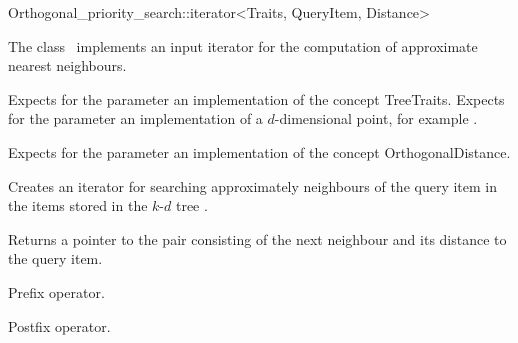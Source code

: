 

\begin{ccRefClass}{Orthogonal_priority_search::iterator<Traits, QueryItem, Distance>}  %


\ccDefinition

The class \ccRefName\ implements an input iterator
for the computation of approximate nearest neighbours.


\ccParameters

Expects for the parameter  an implementation of the concept TreeTraits.
Expects for the parameter   an implementation of a $d$-dimensional point, 
for example .

Expects for the parameter  an implementation of the concept OrthogonalDistance. 

\ccCreation
{}  %

{Creates an iterator for searching approximately neighbours of the query item 
in the items stored in the $k$-$d$ tree .}


{Returns a pointer to the pair consisting of the next neighbour and its distance
to the query item.}

{Prefix operator.}

{Postfix operator.}


\end{ccRefClass}
